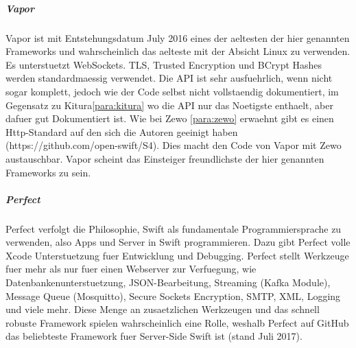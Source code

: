 \subparagraph{Vapor}
\label{para:vapor}
Vapor ist mit Entstehungsdatum July 2016 eines der aeltesten der hier genannten Frameworks und wahrscheinlich das aelteste mit der Absicht Linux zu verwenden. Es unterstuetzt WebSockets. TLS, Trusted Encryption und BCrypt Hashes werden standardmaessig verwendet. Die API ist sehr ausfuehrlich, wenn nicht sogar komplett, jedoch wie der Code selbst nicht vollstaendig dokumentiert, im Gegensatz zu Kitura\ref{para:kitura} wo die API nur das Noetigste enthaelt, aber dafuer gut Dokumentiert ist. Wie bei Zewo \ref{para:zewo} erwaehnt gibt es einen Http-Standard auf den sich die Autoren geeinigt haben (https://github.com/open-swift/S4). Dies macht den Code von Vapor mit Zewo austauschbar. Vapor scheint das Einsteiger freundlichste der hier genannten Frameworks zu sein.
\subparagraph{Perfect}
\label{para:perfect}
Perfect verfolgt die Philosophie, Swift als fundamentale Programmiersprache zu verwenden, also Apps und Server in Swift programmieren. Dazu gibt Perfect volle Xcode Unterstuetzung fuer Entwicklung und Debugging. Perfect stellt Werkzeuge fuer mehr als nur fuer einen Webserver zur Verfuegung, wie Datenbankenunterstuetzung, JSON-Bearbeitung, Streaming (Kafka Module), Message Queue (Mosquitto), Secure Sockets Encryption, SMTP, XML, Logging und viele mehr. Diese Menge an zusaetzlichen Werkzeugen und das schnell robuste Framework spielen wahrscheinlich eine Rolle, weshalb Perfect auf GitHub das beliebteste Framework fuer Server-Side Swift ist (stand Juli 2017).
\chapterend
